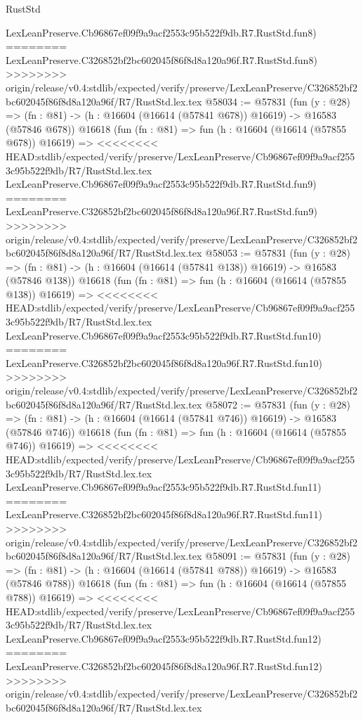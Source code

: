 \begin{lexlean}{RustStd}
\begin{coremodule}
{\begin{coremodule}
{{{{{{{{{{{{{{{{{{{{{{{{{{{{{{{{{{{{{{{{{{{{{{{{{{{{{{{    LexLeanPreserve.Cb96867ef09f9a9acf2553c95b522f9db.R7.RustStd.fun8)
========
    LexLeanPreserve.C326852bf2bc602045f86f8d8a120a96f.R7.RustStd.fun8)
>>>>>>>> origin/release/v0.4:stdlib/expected/verify/preserve/LexLeanPreserve/C326852bf2bc602045f86f8d8a120a96f/R7/RustStd.lex.tex
@58034 := @57831
    (fun (y : @28) =>
    (fn : @81) -> (h : @16604 (@16614 (@57841 @678)) @16619) -> @16583 (@57846 @678))
    @16618
    (fun (fn : @81) =>
    fun (h : @16604 (@16614 (@57855 @678)) @16619) =>
<<<<<<<< HEAD:stdlib/expected/verify/preserve/LexLeanPreserve/Cb96867ef09f9a9acf2553c95b522f9db/R7/RustStd.lex.tex
    LexLeanPreserve.Cb96867ef09f9a9acf2553c95b522f9db.R7.RustStd.fun9)
========
    LexLeanPreserve.C326852bf2bc602045f86f8d8a120a96f.R7.RustStd.fun9)
>>>>>>>> origin/release/v0.4:stdlib/expected/verify/preserve/LexLeanPreserve/C326852bf2bc602045f86f8d8a120a96f/R7/RustStd.lex.tex
@58053 := @57831
    (fun (y : @28) =>
    (fn : @81) -> (h : @16604 (@16614 (@57841 @138)) @16619) -> @16583 (@57846 @138))
    @16618
    (fun (fn : @81) =>
    fun (h : @16604 (@16614 (@57855 @138)) @16619) =>
<<<<<<<< HEAD:stdlib/expected/verify/preserve/LexLeanPreserve/Cb96867ef09f9a9acf2553c95b522f9db/R7/RustStd.lex.tex
    LexLeanPreserve.Cb96867ef09f9a9acf2553c95b522f9db.R7.RustStd.fun10)
========
    LexLeanPreserve.C326852bf2bc602045f86f8d8a120a96f.R7.RustStd.fun10)
>>>>>>>> origin/release/v0.4:stdlib/expected/verify/preserve/LexLeanPreserve/C326852bf2bc602045f86f8d8a120a96f/R7/RustStd.lex.tex
@58072 := @57831
    (fun (y : @28) =>
    (fn : @81) -> (h : @16604 (@16614 (@57841 @746)) @16619) -> @16583 (@57846 @746))
    @16618
    (fun (fn : @81) =>
    fun (h : @16604 (@16614 (@57855 @746)) @16619) =>
<<<<<<<< HEAD:stdlib/expected/verify/preserve/LexLeanPreserve/Cb96867ef09f9a9acf2553c95b522f9db/R7/RustStd.lex.tex
    LexLeanPreserve.Cb96867ef09f9a9acf2553c95b522f9db.R7.RustStd.fun11)
========
    LexLeanPreserve.C326852bf2bc602045f86f8d8a120a96f.R7.RustStd.fun11)
>>>>>>>> origin/release/v0.4:stdlib/expected/verify/preserve/LexLeanPreserve/C326852bf2bc602045f86f8d8a120a96f/R7/RustStd.lex.tex
@58091 := @57831
    (fun (y : @28) =>
    (fn : @81) -> (h : @16604 (@16614 (@57841 @788)) @16619) -> @16583 (@57846 @788))
    @16618
    (fun (fn : @81) =>
    fun (h : @16604 (@16614 (@57855 @788)) @16619) =>
<<<<<<<< HEAD:stdlib/expected/verify/preserve/LexLeanPreserve/Cb96867ef09f9a9acf2553c95b522f9db/R7/RustStd.lex.tex
    LexLeanPreserve.Cb96867ef09f9a9acf2553c95b522f9db.R7.RustStd.fun12)
========
    LexLeanPreserve.C326852bf2bc602045f86f8d8a120a96f.R7.RustStd.fun12)
>>>>>>>> origin/release/v0.4:stdlib/expected/verify/preserve/LexLeanPreserve/C326852bf2bc602045f86f8d8a120a96f/R7/RustStd.lex.tex
}}}}}}}}}}}}}}}}}}}}}}}}}}}}}}}}}}}}}}}}}}}}}}}}}}}}}}}
\end{coremodule}}
\end{coremodule}
\end{lexlean}
